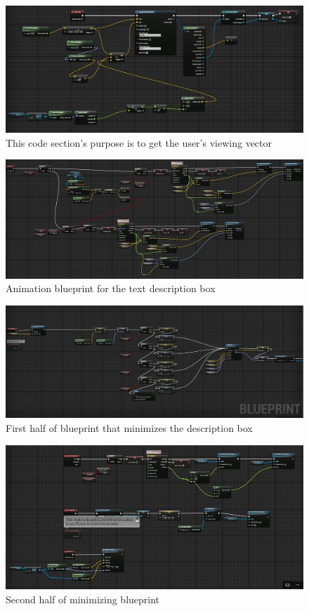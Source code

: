 	\begin{figure}
		\caption{This code section's purpose is to get the user's viewing vector}
		\includegraphics[scale=0.5]{TextDescription1.png}
		\centering
	\end{figure}
	\begin{figure}
		\caption{Animation blueprint for the text description box}
		\includegraphics[scale=0.5]{TextDescription2.png}
		\centering
	\end{figure}
	\begin{figure}
		\caption{First half of blueprint that minimizes the description box}
		\includegraphics[scale=0.5]{TextDescription3.png}
		\centering
	\end{figure}
	\begin{figure}
		\caption{Second half of minimizing blueprint}
		\includegraphics[scale=0.5]{TextDescription4.png}
		\centering
	\end{figure}
	
